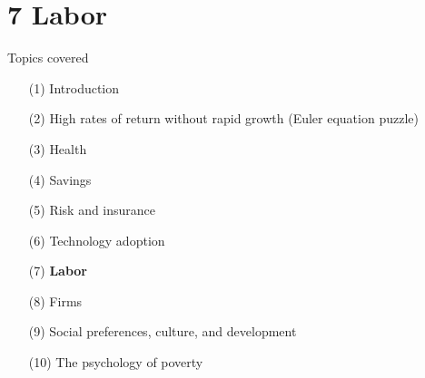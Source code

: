 \documentclass[aspectratio=169, 10pt, handout]{beamer}
\begin{document}
\section{7 Labor}

\begin{frame}{Topics covered}

\small 

\begin{enumerate}[(1)]

	\item[(1)] Introduction 
	
	\item[(2)] {High rates of return without rapid growth (Euler equation puzzle)}

	\item[(3)] {Health}
	
	\item[(4)] {Savings}
		
	\item[(5)] {Risk and insurance}

	\item[(6)] {Technology adoption}
	
	\item[(7)] \textbf{Labor}

	\item[(8)] Firms
	
	\item[(9)] Social preferences, culture, and development
	
	\item[(10)] The psychology of poverty

\end{enumerate}

\end{frame}
\end{document}
